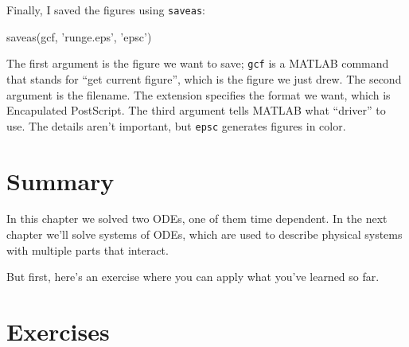 Finally, I saved the figures using {\tt saveas}:

\begin{code}
saveas(gcf, 'runge.eps', 'epsc')
\end{code}

The first argument is the figure we want to save; {\tt gcf} is a MATLAB command that stands for ``get current figure'', which is the figure we just drew.  The second argument is the filename.  The extension specifies the format we want, which is Encapulated PostScript.  The third argument tells MATLAB what ``driver'' to use.  The details aren't important, but {\tt epsc} generates figures in color.


\section{Summary}

In this chapter we solved two ODEs, one of them time dependent.  In the next chapter we'll solve systems of ODEs, which are used to describe physical systems with multiple parts that interact.

But first, here's an exercise where you can apply what you've learned so far.


\section{Exercises}

